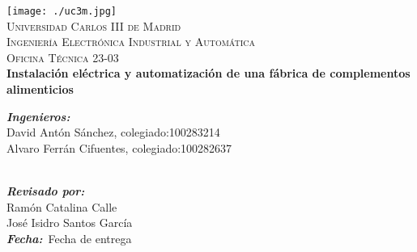 \begin{titlepage}

\begin{center}


\texttt{[image: ./uc3m.jpg]}\\[2cm]    
\textsc{\huge Universidad Carlos III de Madrid}\\[0.5cm]
\textsc{\LARGE Ingeniería Electrónica Industrial y Automática}\\[0.5cm]
\textsc{\Large Oficina Técnica 23-03}\\[4cm]

{\LARGE \bfseries{Instalación eléctrica y automatización de una fábrica de complementos alimenticios}\\[4.5cm]}


\end{center}
\setlength{\parindent}{0cm}


\vspace{10pt}
\emph{\bfseries{Ingenieros:}}\\
David Antón Sánchez, colegiado:100283214\\
Alvaro Ferrán Cifuentes, colegiado:100282637\\\




\emph{\bfseries{Revisado por:}}\\
Ramón Catalina Calle\\
José Isidro Santos García\\



\emph{\bfseries{Fecha:}}\ Fecha de entrega\\












\end{titlepage}